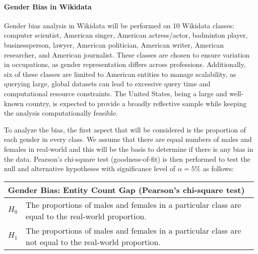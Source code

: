 \paragraph{Gender Bias in Wikidata}
Gender bias analysis in Wikidata will be performed on 10 Wikidata classes: computer scientist, American singer, American actress/actor, badminton player, businessperson, lawyer, American politician, American writer, American researcher, and American journalist. These classes are chosen to ensure variation in occupations, as gender representation differs across professions. Additionally, six of these classes are limited to American entities to manage scalability, as querying large, global datasets can lead to excessive query time and computational resource constraints. The United States, being a large and well-known country, is expected to provide a broadly reflective sample while keeping the analysis computationally feasible.

To analyze the bias, the first aspect that will be considered is the proportion of each gender in every class. We assume that there are equal numbers of males and females in real-world and this will be the basis to determine if there is any bias in the data. Pearson's chi-square test (goodness-of-fit) is then performed to test the null and alternative hypotheses with significance level of \(\alpha=5\%\) as follows:



\begin{table}[h]
    \centering
    \renewcommand{\arraystretch}{1.3}
    \begin{tabular}{|l p{12cm}|} 
        \hline
        \multicolumn{2}{|l|}{\textbf{Gender Bias: Entity Count Gap (Pearson's chi-square test)}} \\
        \hline
        \textbf{$H_0$} & The proportions of males and females in a particular class are equal to the real-world proportion. \\
        \textbf{$H_1$} & The proportions of males and females in a particular class are not equal to the real-world proportion. \\
        \hline
    \end{tabular}
\end{table}

